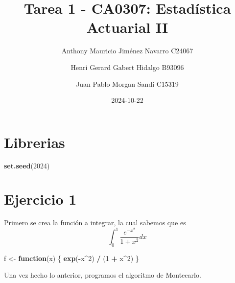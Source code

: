 \documentclass[
]{article}
\title{Tarea 1 - CA0307: Estadística Actuarial II}
\author{Anthony Mauricio Jiménez Navarro \textbar{} C24067 \and Henri
Gerard Gabert Hidalgo \textbar{} B93096 \and Juan Pablo Morgan Sandí
\textbar{} C15319}
\date{2024-10-22}
\newenvironment{Shaded}{\begin{snugshade}}{\end{snugshade}}
\newcommand{\ControlFlowTok}[1]{\textcolor[rgb]{0.13,0.29,0.53}{\textbf{#1}}}
\newcommand{\DecValTok}[1]{\textcolor[rgb]{0.00,0.00,0.81}{#1}}
\newcommand{\FunctionTok}[1]{\textcolor[rgb]{0.13,0.29,0.53}{\textbf{#1}}}
\newcommand{\NormalTok}[1]{#1}
\newcommand{\OtherTok}[1]{\textcolor[rgb]{0.56,0.35,0.01}{#1}}
\newcommand{\SpecialCharTok}[1]{\textcolor[rgb]{0.81,0.36,0.00}{\textbf{#1}}}
\begin{document}
\maketitle

{
\setcounter{tocdepth}{2}
\tableofcontents
}
\section{Librerias}\label{librerias}

\begin{Shaded}
\begin{Highlighting}[]
\FunctionTok{set.seed}\NormalTok{(}\DecValTok{2024}\NormalTok{)}
\end{Highlighting}
\end{Shaded}

\section{Ejercicio 1}\label{ejercicio-1}

Primero se crea la función a integrar, la cual sabemos que es \[
\int_0^1 \frac{e^{-x^2}}{1+x^2} d x
\]

\begin{Shaded}
\begin{Highlighting}[]
\NormalTok{f }\OtherTok{\textless{}{-}} \ControlFlowTok{function}\NormalTok{(x) \{}
  \FunctionTok{exp}\NormalTok{(}\SpecialCharTok{{-}}\NormalTok{x}\SpecialCharTok{\^{}}\DecValTok{2}\NormalTok{) }\SpecialCharTok{/}\NormalTok{ (}\DecValTok{1} \SpecialCharTok{+}\NormalTok{ x}\SpecialCharTok{\^{}}\DecValTok{2}\NormalTok{)}
\NormalTok{\}}
\end{Highlighting}
\end{Shaded}

Una vez hecho lo anterior, programos el algoritmo de Montecarlo.
\end{document}
